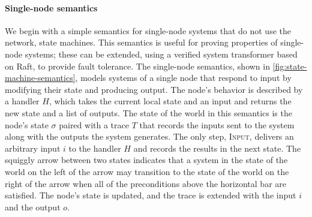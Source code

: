 \paragraph{Single-node semantics} We begin with a simple semantics for
single-node systems that do not use the network, \ie state machines.
%
This semantics is useful for proving properties of single-node systems;
these can be extended, using a verified system transformer based on Raft,
to provide fault tolerance.
%
The single-node semantics, shown in \cref{fig:state-machine-semantics},
models systems of a single node that respond to input by modifying their
state and producing output.
%
The node's behavior is described by a handler $H$, which takes the current
local state and an input and returns the new state and a list of outputs.
%
The state of the world in this semantics is the node's state $\sigma$
paired with a trace $T$ that records the inputs sent to the system along
with the outputs the system generates.
%
The only step, \textsc{Input}, delivers an arbitrary input $i$ to the
handler $H$ and records the results in the next state.
%
The squiggly arrow between two states indicates that a system in the
state of the world on the left of the arrow may transition to the
state of the world on the right of the arrow when all of the
preconditions above the horizontal bar are satisfied. The node's state
is updated, and the trace is extended with the input $i$ and the
output $o$.

